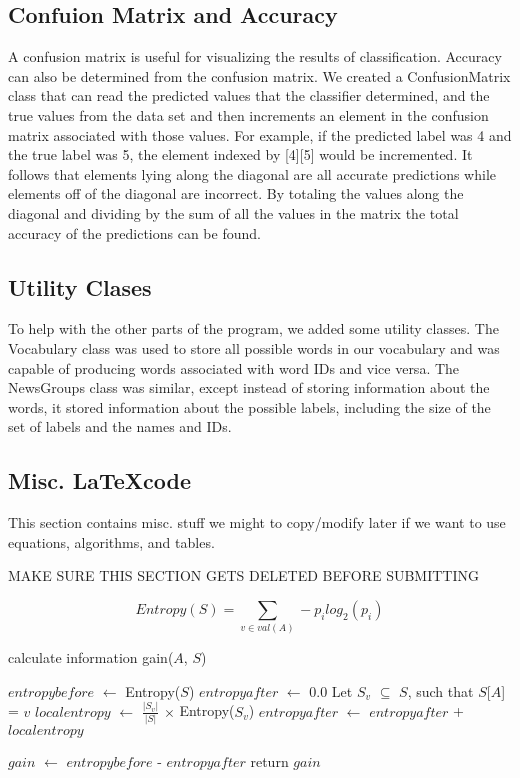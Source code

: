 \documentclass{IEEEtran}
\begin{document}
\subsection{Confuion Matrix and Accuracy}
A confusion matrix is useful for visualizing the results of classification. Accuracy can also be determined from the confusion matrix. We created a ConfusionMatrix class that can read the predicted values that the classifier determined, and the true values from the data set and then increments an element in the confusion matrix associated with those values. For example, if the predicted label was 4 and the true label was 5, the element indexed by [4][5] would be incremented. It follows that elements lying along the diagonal are all accurate predictions while elements off of the diagonal are incorrect. By totaling the values along the diagonal and dividing by the sum of all the values in the matrix the total accuracy of the predictions can be found. 

\subsection{Utility Clases}
To help with the other parts of the program, we added some utility classes. The Vocabulary class was used to store all possible words in our vocabulary and was capable of producing words associated with word IDs and vice versa. The NewsGroups class was similar, except instead of storing information about the words, it stored information about the possible labels, including the size of the set of labels and the names and IDs.

\subsection{Misc. \LaTeX code}
This section contains misc. stuff we might to copy/modify later if we want to use equations, algorithms, and tables.

MAKE SURE THIS SECTION GETS DELETED BEFORE SUBMITTING

\begin{equation}
\label{entropy-equation}
Entropy(S) = \sum_{v\in val(A)}-p_ilog_2(p_i)
\end{equation}


\begin{algorithm}
\caption{calculate information gain($A$, $S$)}
\begin{algorithmic}
\Statex{}
\State $entropybefore$ $\leftarrow$ Entropy($S$)
\State $entropyafter$ $\leftarrow$ 0.0
  \State Let $S_v$ $\subseteq$ $S$, such that $S$[$A$] = $v$
  \State $localentropy$ $\leftarrow$ $\frac{|S_v|}{|S|}$ $\times$ Entropy($S_v$)
  \State $entropyafter$ $\leftarrow$ $entropyafter$ + $localentropy$
\EndFor

\State $gain$ $\leftarrow$ $entropybefore$ - $entropyafter$
\State return $gain$
\end{algorithmic}
\end{algorithm}
\end{document}
